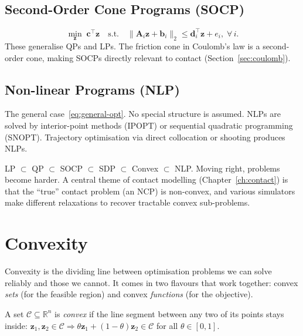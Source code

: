 \documentclass[11pt,twoside]{report}
\theoremstyle{definition}
\theoremstyle{plain}
\theoremstyle{remark}
\newcommand{\R}{\mathbb{R}}
\newcommand{\0}{\bm{0}}
\begin{document}
\subsection{Second-Order Cone Programs (SOCP)}
\begin{equation}
\min_{\bm{z}}\;\bm{c}^{\!\top}\bm{z}\quad\text{s.t.}\quad
\|\bm{A}_{i}\bm{z}+\bm{b}_{i}\|_{2}\le\bm{d}_{i}^{\!\top}\bm{z}+e_{i},\;
\forall\,i.
\end{equation}
These generalise QPs and LPs.  The friction cone in Coulomb's law is a second-order cone, making SOCPs directly relevant to contact (Section~\ref{sec:coulomb}).

\subsection{Non-linear Programs (NLP)}
The general case~\eqref{eq:general-opt}.  No special structure is assumed.
NLPs are solved by interior-point methods (IPOPT) or sequential quadratic programming (SNOPT).  Trajectory optimisation via direct collocation or shooting produces NLPs.

\begin{insightbox}
LP $\subset$ QP $\subset$ SOCP $\subset$ SDP $\subset$ Convex $\subset$ NLP.
Moving right, problems become harder.
A central theme of contact modelling (Chapter~\ref{ch:contact}) is that the
``true'' contact problem (an NCP) is non-convex, and various simulators
make different relaxations to recover tractable convex sub-problems.
\end{insightbox}

\section{Convexity}

Convexity is the dividing line between optimisation problems we can
solve reliably and those we cannot. It comes in two flavours that work
together: convex \emph{sets} (for the feasible region) and convex
\emph{functions} (for the objective).

\begin{definitionbox}
A set $\mathcal{C}\subseteq\R^{n}$ is \emph{convex} if the line segment
between any two of its points stays inside:
$\bm{z}_{1},\bm{z}_{2}\in\mathcal{C}\Rightarrow
\theta\bm{z}_{1}+(1{-}\theta)\bm{z}_{2}\in\mathcal{C}$
for all $\theta\in[0,1]$.
\end{definitionbox}
\end{document}
